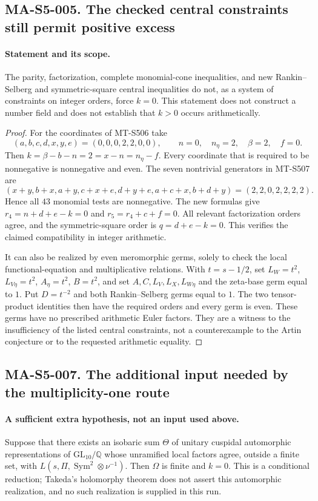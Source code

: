 \subsection*{MA-S5-005. The checked central constraints still permit positive excess}

\paragraph{Statement and its scope.}
The parity, factorization, complete monomial-cone inequalities,
and new Rankin--Selberg and symmetric-square central inequalities
do not, as a system
of constraints on integer orders, force $k=0$. This statement
does not construct a number field and does not establish that
$k>0$ occurs arithmetically.

\begin{proof}
For the coordinates of MT-S506 take
\[
 (a,b,c,d,x,y,e)=(0,0,0,2,2,0,0),
 \qquad n=0,\quad n_\eta=2,\quad\beta=2,\quad f=0.
 \tag{MA-S5.15}
\]
Then $k=\beta-b-n=2=x-n=n_\eta-f$. Every coordinate that is
required to be nonnegative is nonnegative and even. The seven
nontrivial generators in MT-S507 are
\[
 (x+y,b+x,a+y,c+x+e,d+y+e,a+c+x,b+d+y)
                       =(2,2,0,2,2,2,2).
\]
Hence all $43$ monomial tests are nonnegative. The new formulas
give $r_4=n+d+e-k=0$ and $r_5=r_4+c+f=0$. All relevant
factorization orders agree, and the symmetric-square order is
$q=d+e-k=0$. This verifies the claimed
compatibility in integer arithmetic.

It can also be realized by even meromorphic germs, solely to
check the local functional-equation and multiplicative relations.
With $t=s-1/2$, set $L_W=t^2$, $L_{V\eta}=t^2$,
$A_\eta=t^2$, $B=t^2$, and set $A,C,L_V,L_X,L_{W\eta}$ and
the zeta-base germ equal to $1$. Put $D=t^{-2}$ and both
Rankin--Selberg germs equal to $1$. The two tensor-product
identities then have the required orders and every germ is even.
These germs have no prescribed arithmetic Euler factors. They
are a witness to the insufficiency of the listed central
constraints, not a counterexample to the Artin conjecture or to
the requested arithmetic equality.
\end{proof}

\subsection*{MA-S5-007. The additional input needed by the multiplicity-one route}

\paragraph{A sufficient extra hypothesis, not an input used above.}
Suppose that there exists an isobaric sum $\Theta$ of unitary cuspidal
automorphic representations of $\mathrm{GL}_{10}/\mathbb Q$ whose
unramified local factors agree, outside a finite set, with
$L(s,\Pi,\operatorname{Sym}^2\otimes\nu^{-1})$.
Then $\Omega$ is finite and $k=0$. This is a conditional reduction;
Takeda's holomorphy theorem does not assert this automorphic
realization, and no such realization is supplied in this run.

